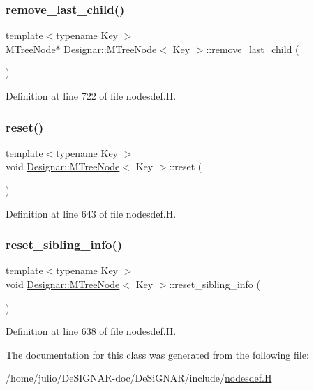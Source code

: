 \subsubsection{\texorpdfstring{remove\+\_\+last\+\_\+child()}{remove\_last\_child()}}
{\footnotesize\ttfamily template$<$typename Key $>$ \\
\hyperlink{class_designar_1_1_m_tree_node}{M\+Tree\+Node}$\ast$ \hyperlink{class_designar_1_1_m_tree_node}{Designar\+::\+M\+Tree\+Node}$<$ Key $>$\+::remove\+\_\+last\+\_\+child (\begin{DoxyParamCaption}{ }\end{DoxyParamCaption})\hspace{0.3cm}{\ttfamily [inline]}}



Definition at line 722 of file nodesdef.\+H.

\mbox{\label{class_designar_1_1_m_tree_node_a83e06dcf705a55bbf7a2963f7d95fdeb}} 
\subsubsection{\texorpdfstring{reset()}{reset()}}
{\footnotesize\ttfamily template$<$typename Key $>$ \\
void \hyperlink{class_designar_1_1_m_tree_node}{Designar\+::\+M\+Tree\+Node}$<$ Key $>$\+::reset (\begin{DoxyParamCaption}{ }\end{DoxyParamCaption})\hspace{0.3cm}{\ttfamily [inline]}}



Definition at line 643 of file nodesdef.\+H.

\mbox{\label{class_designar_1_1_m_tree_node_a7bbcaf3f2dc77eaf4c593e64ca20c5f0}} 
\subsubsection{\texorpdfstring{reset\+\_\+sibling\+\_\+info()}{reset\_sibling\_info()}}
{\footnotesize\ttfamily template$<$typename Key $>$ \\
void \hyperlink{class_designar_1_1_m_tree_node}{Designar\+::\+M\+Tree\+Node}$<$ Key $>$\+::reset\+\_\+sibling\+\_\+info (\begin{DoxyParamCaption}{ }\end{DoxyParamCaption})\hspace{0.3cm}{\ttfamily [inline]}}



Definition at line 638 of file nodesdef.\+H.



The documentation for this class was generated from the following file\+:\begin{DoxyCompactItemize}
\item 
/home/julio/\+De\+S\+I\+G\+N\+A\+R-\/doc/\+De\+Si\+G\+N\+A\+R/include/\hyperlink{nodesdef_8_h}{nodesdef.\+H}\end{DoxyCompactItemize}
